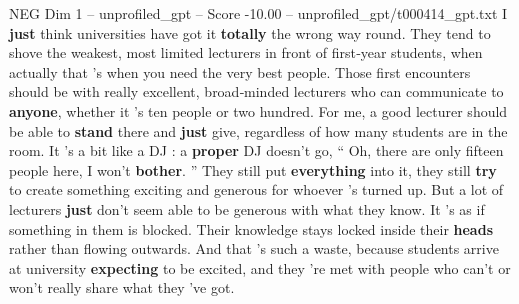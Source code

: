 \begin{textsample}{NEG Dim 1 – unprofiled\_gpt – Score -10.00 – unprofiled\_gpt/t000414\_gpt.txt}  \label{ex:f1_neg_023}
I \textbf{just} think universities have got it \textbf{totally} the wrong way round.
They tend to shove the weakest, most limited lecturers in front of first‑year students, when actually that ’s when you need the very best people.
Those first encounters should be with really excellent, broad‑minded lecturers who can communicate to \textbf{anyone}, whether it ’s ten people or two hundred.
For me, a good lecturer should be able to \textbf{stand} there and \textbf{just} give, regardless of how many students are in the room.
It ’s a bit like a DJ : a \textbf{proper} DJ doesn't go, “ Oh, there are only fifteen people here, I won't \textbf{bother}. ” They still put \textbf{everything} into it, they still \textbf{try} to create something exciting and generous for whoever ’s turned up.
But a lot of lecturers \textbf{just} don't seem able to be generous with what they know.
It ’s as if something in them is blocked.
Their knowledge stays locked inside their \textbf{heads} rather than flowing outwards.
And that ’s such a waste, because students arrive at university \textbf{expecting} to be excited, and they ’re met with people who can't or won't really share what they ’ve got.

\end{textsample}
